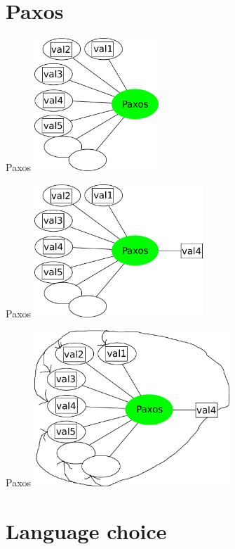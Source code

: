 \documentclass[14pt]{beamer}
\begin{document}
\section{Paxos}

\begin{frame}{Paxos}
    \pause
    \vspace{0.35cm}
    \hskip0.6cm
    \includegraphics[height=5cm]{images/paxos1.pdf}
\end{frame}

\begin{frame}{Paxos}
    \vspace{0.35cm}
    \hskip0.6cm
    \includegraphics[height=5cm]{images/paxos2.pdf}
\end{frame}

\begin{frame}{Paxos}
    \includegraphics[height=5.87cm]{images/paxos3.pdf}
\end{frame}

\section{Language choice}
\end{document}
